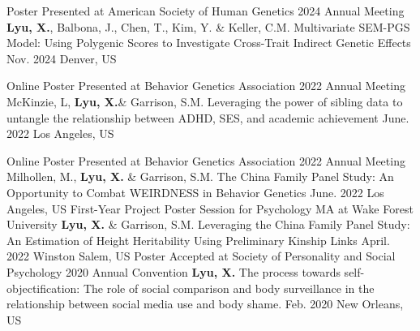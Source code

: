 

\begin{cventries2}

  \cventryx
    {Poster Presented at American Society of Human Genetics 2024 Annual Meeting} %
    {\textbf{Lyu, X.}, Balbona, J., Chen, T., Kim, Y. \& Keller, C.M.  Multivariate SEM-PGS Model: Using Polygenic Scores to Investigate Cross-Trait Indirect Genetic Effects} 
    {Nov. 2024} %
    {Denver, US} %
     
    {Online Poster Presented at Behavior Genetics Association 2022 Annual Meeting} %
    {McKinzie, L, \textbf{Lyu, X.}\& Garrison, S.M. Leveraging the power of sibling data to untangle the relationship between ADHD, SES, and academic achievement} 
    {June. 2022} %
    {Los Angeles, US} %
    
    \cventryx
  	{Online Poster Presented at Behavior Genetics Association 2022 Annual Meeting} %
    {Milhollen, M., \textbf{Lyu, X.}  \& Garrison, S.M. The China Family Panel Study: An Opportunity to Combat WEIRDNESS in Behavior Genetics} 
    {June. 2022} %
    {Los Angeles, US} %
    \cventryx
  	{First-Year Project Poster Session for Psychology MA at Wake Forest University} %
    {\textbf{Lyu, X.}  \& Garrison, S.M. Leveraging the China Family Panel Study: An Estimation of Height Heritability Using Preliminary Kinship Links} 
    {April. 2022} %
    {Winston Salem, US} %
    \cventryx
	{Poster Accepted at Society of Personality and Social Psychology 2020 Annual Convention} %
    {\textbf{Lyu, X.} The process towards self-objectification: The role of social comparison and body surveillance in the relationship between social media use and body shame. } %
    {Feb. 2020} %
    {New Orleans, US}

\end{cventries2}

